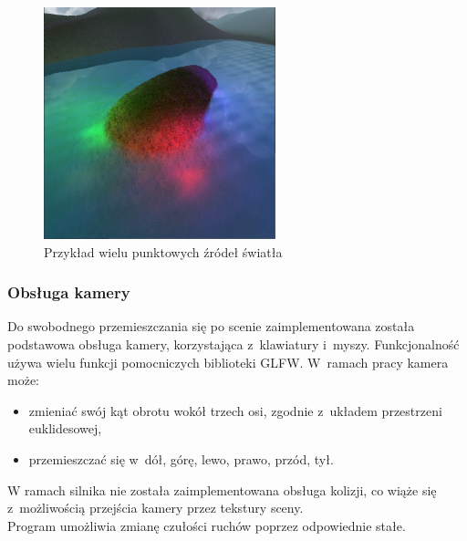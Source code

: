 \documentclass[a4paper,twoside,12pt]{book}
\begin{document}
\begin{figure}[H]
    \centering
    \includegraphics[width=0.6\textwidth]{res/multilight_example.png}
    \caption{Przykład wielu punktowych źródeł światła}
    \label{fig:multilight_example}
\end{figure}


\subsubsection{Obsługa kamery}
Do swobodnego przemieszczania się po scenie zaimplementowana została podstawowa obsługa kamery, korzystająca z~klawiatury i~myszy. Funkcjonalność używa wielu funkcji pomocniczych biblioteki GLFW. W~ramach pracy kamera może:
\begin{itemize}
    \item zmieniać swój kąt obrotu wokół trzech osi, zgodnie z~układem przestrzeni euklidesowej,
    \item przemieszczać się w~dół, górę, lewo, prawo, przód, tył.
\end{itemize}
W ramach silnika nie została zaimplementowana obsługa kolizji, co wiąże się z~możliwością przejścia kamery przez tekstury sceny. \\
Program umożliwia zmianę czułości ruchów poprzez odpowiednie stałe.
\end{document}
